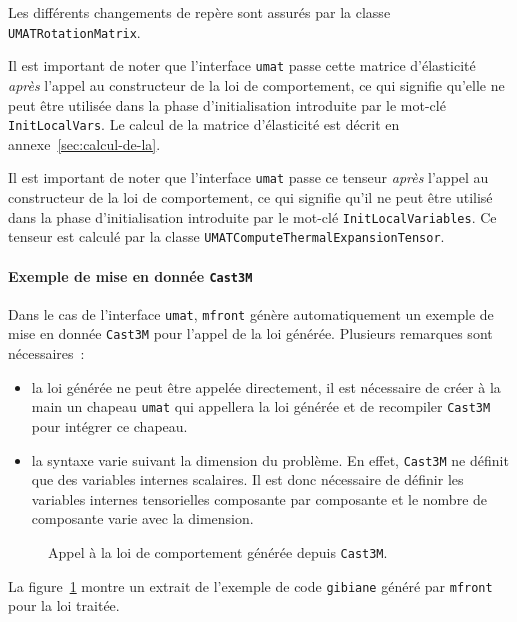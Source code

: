 \documentclass[rectoverso,pleiades,pstricks,leqno,anti]{texmf/note_technique_2010}
\newcommand{\mfront}{\texttt{mfront}}
\newcommand{\castem}{\texttt{Cast3M}}
\newcommand{\code}[1]{
  \psframebox[linecolor=ceaorange,shadow=true,blur=true]{
    \begin{minipage}[htbp]{1.0\linewidth}
      \ttfamily\scriptsize #1
    \end{minipage}
  }
}
\begin{document}
Les différents changements de repère sont assurés par la classe
\texttt{UMAT\-Rotation\-Matrix}.

 Il est important de noter que l'interface \texttt{umat}
passe cette matrice d'élasticité {\em après} l'appel au constructeur
de la loi de comportement, ce qui signifie qu'elle ne peut être
utilisée dans la phase d'initialisation introduite par le mot-clé {\tt
  Init\-Local\-Vars}. Le calcul de la matrice d'élasticité est décrit
en annexe~\ref{sec:calcul-de-la}.

Il est important de noter que l'interface \texttt{umat} passe ce tenseur
{\em après} l'appel au constructeur de la loi de comportement, ce qui
signifie qu'il ne peut être utilisé dans la phase d'initialisation
introduite par le mot-clé {\tt Init\-Local\-Variables}. Ce tenseur est
calculé par la classe {\tt UMAT\-Compute\-Thermal\-Expansion\-Tensor}.


\paragraph{Exemple de mise en donnée \castem{}} Dans le cas
de l'interface \texttt{umat}, \mfront{} génère automatiquement
un exemple de mise en donnée \castem{} pour l'appel de la loi
générée. Plusieurs remarques sont nécessaires~:
\begin{itemize}
\item la loi générée ne peut être appelée directement, il est
nécessaire de créer à la main un chapeau \texttt{umat} qui
appellera la loi générée et de recompiler \castem{} pour
intégrer ce chapeau.
\item la syntaxe varie suivant la dimension du problème. En
effet, \castem{} ne définit que des variables internes
scalaires. Il est donc nécessaire de définir les variables
internes tensorielles composante par composante et le
nombre de composante varie avec la dimension.
\end{itemize}

\begin{figure}[htbp]
  \centering
  \code{{\ttfamily }}  
  \caption{Appel à la loi de comportement générée depuis \castem{}.}
  \label{fig:mfrontcastem}
\end{figure}

La figure~\ref{fig:mfrontcastem} montre un extrait de
l'exemple de code \texttt{gibiane} généré par \mfront{}
pour la loi traitée.
\end{document}
